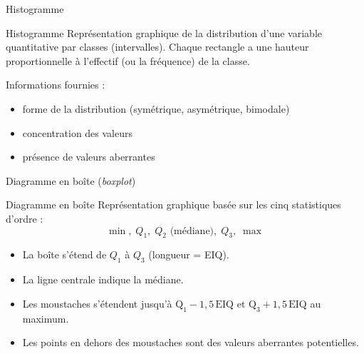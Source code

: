\documentclass{BeamerTemplate}
\begin{document}
\begin{frame}[t]{Histogramme}

\begin{Boite}{Histogramme}
Représentation graphique de la distribution d'une variable quantitative par classes (intervalles). Chaque rectangle a une hauteur proportionnelle à l'effectif (ou la fréquence) de la classe.
\end{Boite}

\medskip
Informations fournies :
\begin{itemize}\itemsep3mm
  \item forme de la distribution (symétrique, asymétrique, bimodale)
  \item concentration des valeurs
  \item présence de valeurs aberrantes
\end{itemize}

\end{frame}

\begin{frame}[t]{Diagramme en boîte (\textit{boxplot})}

\begin{Boite}{Diagramme en boîte}
Représentation graphique basée sur les cinq statistiques d'ordre :
$$\min, \; Q_1, \; Q_2\text{ (médiane)}, \; Q_3, \; \max$$
\end{Boite}

\medskip
\begin{itemize}\itemsep4mm
  \item La boîte s'étend de $Q_1$ à $Q_3$ (longueur = EIQ).
  \item La ligne centrale indique la médiane.
  \item Les moustaches s'étendent jusqu'à $\text{Q}_1 - 1{,}5\,\text{EIQ}$ et $\text{Q}_3 + 1{,}5\,\text{EIQ}$ au maximum.
  \item Les points en dehors des moustaches sont des \alert{valeurs aberrantes potentielles}.
\end{itemize}

\end{frame}
\end{document}
